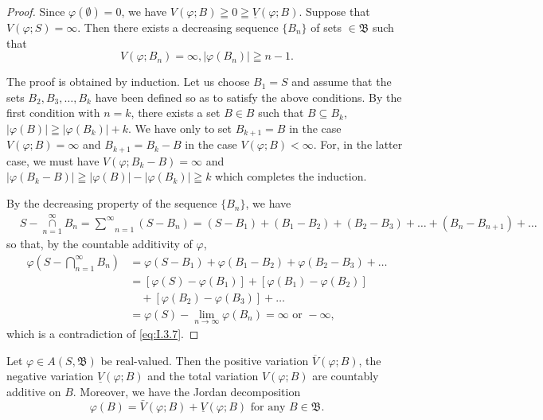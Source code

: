 \begin{proof}
 Since $\varphi(\emptyset) = 0$, we have $V(\varphi; B) \geqq 0 \geqq \underline{V}(\varphi; B)$. Suppose that $V(\varphi; S) = \infty$. Then there exists a decreasing sequence $\{B_n\}$ of sets $\in \mathfrak{B}$ such that 
\[
V (\varphi ; B_{n}) = \infty , | \varphi (B_{n}) | \geqq n- 1. \]

The proof is obtained by induction. Let us choose $B_{1}=S$ and assume that the sets $B_{2}, B_{3}, \ldots, B_{k}$ have been defined so as to satisfy the above conditions. By the first condition with $n=k$, there exists a set $B \in B$ such that $B \subseteq B_k$, $|\varphi(B)| \geqq |\varphi(B_k)| + k$. We have only to set $B_{k+1} = B$ in the case $V(\varphi; B) = \infty$ and $B_{k+1} = B_k- B$ in the case $V(\varphi; B) < \infty$. For, in the latter case, we must have $V(\varphi; B_k- B) = \infty$ and $|\varphi(B_k- B)| \geqq |\varphi(B)|- |\varphi(B_k)| \geqq k$ which completes the induction. 

By the decreasing property of the sequence $\{B_n\}$, we have 
\[
\begin{aligned}
&S- \underset {n = 1} {\overset {\infty} {\cap}} B_{n}  = \underset {n = 1} {\overset {\infty} {\sum}} (S- B_{n}) = (S- B_{1}) + (B_{1}- B_{2}) + (B_{2}- B_{3}) + \dots + (B_{n}- B_{n+1}) + \dots
\end{aligned}
\]
so that, by the countable additivity of $\varphi$, 
\[
\begin{aligned} \varphi \left(S- \bigcap\limits_{n=1} ^{\infty} B_{n}\right) & = \varphi (S- B_{1}) + \varphi (B_{1}- B_{2}) + \varphi (B_{2}- B_{3}) + \dots \\ & = [ \varphi (S)- \varphi (B_{1}) ] + [ \varphi (B_{1})- \varphi (B_{2}) ] \\ & \quad + [ \varphi (B_{2})- \varphi (B_{3}) ] + \dots \\ & = \varphi (S)- \lim\limits_{n \to \infty} \varphi (B_{n}) = \infty \text{ or }- \infty , \end{aligned}
\]
which is a contradiction of \eqref{eq:I.3.7}. 
\end{proof}
\begin{theorem}\label{thm:I.3.Theorem.2} Let $\varphi \in A(S, \mathfrak{B})$ be real-valued. Then the positive variation $\overline{V}(\varphi; B)$, the negative variation $\underline{V}(\varphi; B)$ and the total variation $V(\varphi; B)$ are countably additive on $B$. Moreover, we have the Jordan decomposition 
\begin{equation}\label{eq:I.3.11}
\varphi (B) = \bar {V} (\varphi ; B) + \underline {{{V}}} (\varphi ; B) \text{ for any } B \in \mathfrak {B}.
\end{equation}
\end{theorem}

